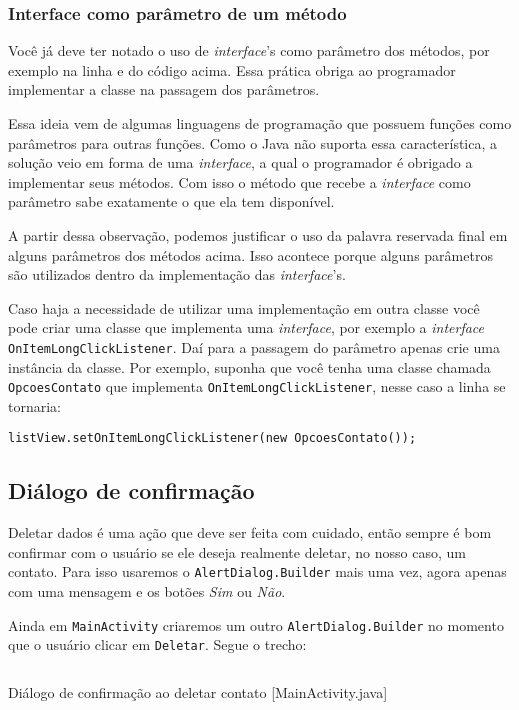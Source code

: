 \subsubsection{Interface como parâmetro de um método}

Você já deve ter notado o uso de \emph{interface}'s como parâmetro dos
métodos, por exemplo na linha  e  do código
acima. Essa prática obriga ao programador implementar a classe na
passagem dos parâmetros.

Essa ideia vem de algumas linguagens de programação que possuem funções
como parâmetros para outras funções. Como o Java não suporta essa
característica, a solução veio em forma de uma \emph{interface}, a qual
o programador é obrigado a implementar seus métodos. Com isso o método
que recebe a \emph{interface} como parâmetro sabe exatamente o que ela
tem disponível.

A partir dessa observação, podemos justificar o uso da palavra reservada
final em alguns parâmetros dos métodos acima. Isso acontece porque
alguns parâmetros são utilizados dentro da implementação das
\emph{interface}'s.

Caso haja a necessidade de utilizar uma implementação em outra classe
você pode criar uma classe que implementa uma \emph{interface}, por
exemplo a \emph{interface} \texttt{OnItemLongClickListener}. Daí para a
passagem do parâmetro apenas crie uma instância da classe. Por exemplo,
suponha que você tenha uma classe chamada \texttt{OpcoesContato} que
implementa \texttt{OnItemLongClickListener}, nesse caso a linha
 se tornaria:

\texttt{listView.setOnItemLongClickListener(new OpcoesContato());}

\subsection{Diálogo de confirmação}

Deletar dados é uma ação que deve ser feita com cuidado, então sempre é
bom confirmar com o usuário se ele deseja realmente deletar, no nosso
caso, um contato. Para isso usaremos o \texttt{AlertDialog.Builder} mais
uma vez, agora apenas com uma mensagem e os botões \emph{Sim} ou
\emph{Não}.

Ainda em \texttt{MainActivity} criaremos um outro
\texttt{AlertDialog.Builder} no momento que o usuário clicar em
\texttt{Deletar}. Segue o trecho:

\begin{listing}[H]
  \inputminted[linenos=true,frame=bottomline,tabsize=3]{ java }{ source/MainActivity-9.java }
  \caption{Diálogo de confirmação ao deletar contato [MainActivity.java]}
\end{listing}

